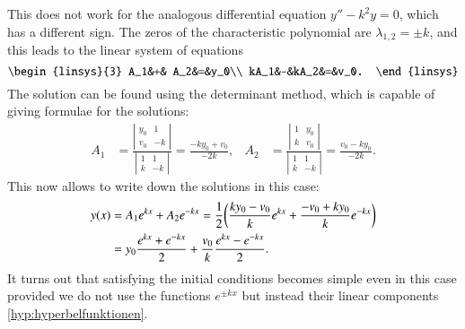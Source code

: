 This does not work for the analogous differential equation
$y''-k^2y=0$, which has a different sign.
The zeros of the characteristic polynomial are $\lambda_{1,2}=\pm k$,
and this leads to the linear system of equations
\[
\begin{linsys}{3}
 A_1&+& A_2&=&y_0\\
kA_1&-&kA_2&=&v_0.
\end{linsys}
\]
The solution can be found using the determinant method, which is
capable of giving formulae for the solutions:
\begin{align*}
A_1
&=
\frac{\left|\begin{matrix}y_0&1\\v_0&-k\end{matrix}\right|}{\left|\begin{matrix}1&1\\k&-k\end{matrix}\right|}
=
\frac{-ky_0+v_0}{-2k},
&
A_2
&=
\frac{\left|\begin{matrix}1&y_0\\k&v_0\end{matrix}\right|}{\left|\begin{matrix}1&1\\k&-k\end{matrix}\right|}
=\frac{v_0-ky_0}{-2k}.
\end{align*}
This now allows to write down the solutions in this case:
\begin{align}
y(x)
&=
A_1e^{kx}+A_2e^{-kx}
=
\frac12\biggl(
\frac{ky_0-v_0}k e^{kx}
+
\frac{-v_0+ky_0}k e^{-kx}
\biggr)
\notag
\\
&=
y_0\frac{e^{kx}+e^{-kx}}2
+\frac{v_0}{k}\frac{e^{kx}-e^{-kx}}2.
\label{hyp:hyperbelfunktionen}
\end{align}
It turns out that satisfying the initial conditions becomes simple
even in this case provided we do not use the functions $e^{\pm kx}$
but instead their linear components \eqref{hyp:hyperbelfunktionen}.

